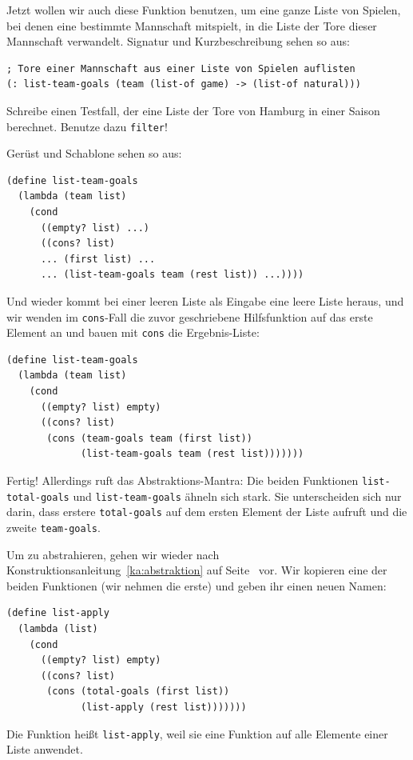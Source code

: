 %
Jetzt wollen wir auch diese Funktion benutzen, um eine ganze Liste von
Spielen, bei denen eine bestimmte Mannschaft mitspielt, in die Liste
der Tore dieser Mannschaft verwandelt.  Signatur und Kurzbeschreibung
sehen so aus:
%
\begin{lstlisting}
; Tore einer Mannschaft aus einer Liste von Spielen auflisten
(: list-team-goals (team (list-of game) -> (list-of natural)))
\end{lstlisting}
%
\begin{aufgabeinline}
  Schreibe einen Testfall, der eine Liste der Tore von Hamburg in
  einer Saison berechnet.  Benutze dazu \lstinline{filter}! 
\end{aufgabeinline}
%
Gerüst und Schablone sehen so aus:
%
\begin{lstlisting}
(define list-team-goals
  (lambda (team list)
    (cond
      ((empty? list) ...)
      ((cons? list)
      ... (first list) ...
      ... (list-team-goals team (rest list)) ...))))
\end{lstlisting}
%
Und wieder kommt bei einer leeren Liste als Eingabe eine leere Liste
heraus, und wir wenden im \lstinline{cons}-Fall die zuvor geschriebene
Hilfsfunktion auf das erste Element an und bauen mit \lstinline{cons}
die Ergebnis-Liste:
%
\begin{lstlisting}
(define list-team-goals
  (lambda (team list)
    (cond
      ((empty? list) empty)
      ((cons? list)
       (cons (team-goals team (first list))
             (list-team-goals team (rest list)))))))
\end{lstlisting}
%
Fertig! Allerdings ruft das Abstraktions-Mantra: Die beiden Funktionen
\lstinline{list-total-goals} und \lstinline{list-team-goals} ähneln
sich stark.  Sie unterscheiden sich nur darin, dass erstere
\lstinline{total-goals} auf dem ersten Element der Liste aufruft
und die zweite \lstinline{team-goals}. 

Um zu abstrahieren, gehen wir wieder nach
Konstruktionsanleitung~\ref{ka:abstraktion} auf
Seite~\pageref{ka:abstraktion} vor.  Wir kopieren eine der beiden
Funktionen (wir nehmen die erste) und geben ihr einen neuen Namen:
%
\begin{lstlisting}
(define list-apply
  (lambda (list)
    (cond
      ((empty? list) empty)
      ((cons? list)
       (cons (total-goals (first list))
             (list-apply (rest list)))))))
\end{lstlisting}
%
Die Funktion heißt \lstinline{list-apply}, weil sie eine Funktion auf
alle Elemente einer Liste anwendet.

